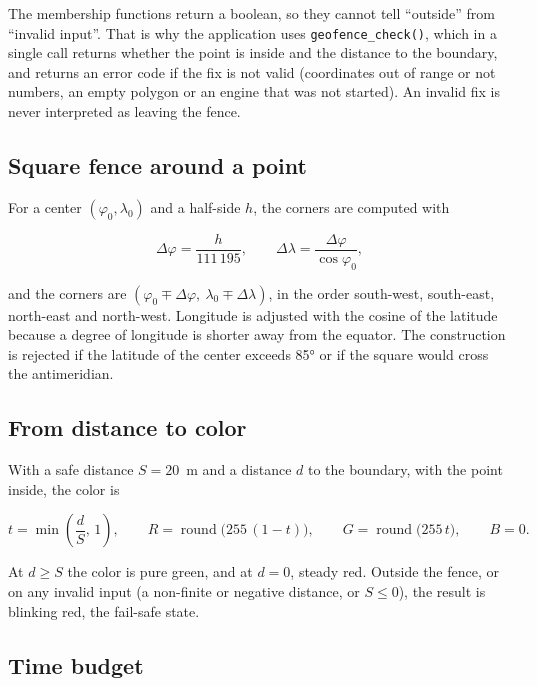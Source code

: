 The membership functions return a boolean, so they cannot tell ``outside'' from ``invalid input''. That is why
the application uses \texttt{geofence\_check()}, which in a single call returns whether the point is inside
and the distance to the boundary, and returns an error code if the fix is not valid (coordinates out of range
or not numbers, an empty polygon or an engine that was not started). An invalid fix is never interpreted as
leaving the fence.

\subsection{Square fence around a point}

For a center $(\varphi_0, \lambda_0)$ and a half-side $h$, the corners are computed with

\begin{equation}
\Delta\varphi = \frac{h}{111\,195}, \qquad \Delta\lambda = \frac{\Delta\varphi}{\cos\varphi_0},
\end{equation}

and the corners are $(\varphi_0 \mp \Delta\varphi,\ \lambda_0 \mp \Delta\lambda)$, in the order south-west,
south-east, north-east and north-west. Longitude is adjusted with the cosine of the latitude because a degree
of longitude is shorter away from the equator. The construction is rejected if the latitude of the center
exceeds 85° or if the square would cross the antimeridian.

\subsection{From distance to color}

With a safe distance $S = 20$~m and a distance $d$ to the boundary, with the point inside, the color is

\begin{equation}
t = \min\!\left(\frac{d}{S},\,1\right), \qquad
R = \operatorname{round}\bigl(255\,(1-t)\bigr), \qquad
G = \operatorname{round}\bigl(255\,t\bigr), \qquad B = 0.
\end{equation}

At $d \ge S$ the color is pure green, and at $d = 0$, steady red. Outside the fence, or on any invalid input
(a non-finite or negative distance, or $S \le 0$), the result is blinking red, the fail-safe state.

\subsection{Time budget}

